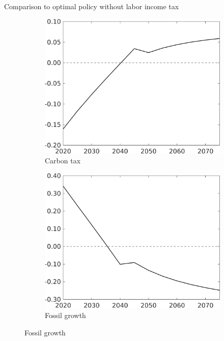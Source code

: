 \documentclass[11pt,aspectratio=169]{beamer}
\begin{document}
\begin{frame}{Comparison to optimal policy without labor income tax}
	\centering
\begin{figure}[h!!]
	\centering
	\begin{subfigure}{0.32\textwidth}		
		\caption{Carbon tax}
		\includegraphics[width=1\textwidth]{../codding_model/own_basedOnFried/optimalPol_010922_revision/figures/all_13Sept22_Tplus30/Tauf_OPT_COMPtaulPer_regime4_spillover0_knspil0_noskill0_sep0_xgrowth0_PV1_etaa0.79.png}
	\end{subfigure}
	\begin{subfigure}{0.32\textwidth}		
	\caption{Fossil growth}
	\includegraphics[width=1\textwidth]{../codding_model/own_basedOnFried/optimalPol_010922_revision/figures/all_13Sept22_Tplus30/gAf_OPT_COMPtaulPer_regime4_spillover0_knspil0_noskill0_sep0_xgrowth0_PV1_etaa0.79.png}

\end{subfigure}
\end{figure}
\end{frame}
\end{document}
